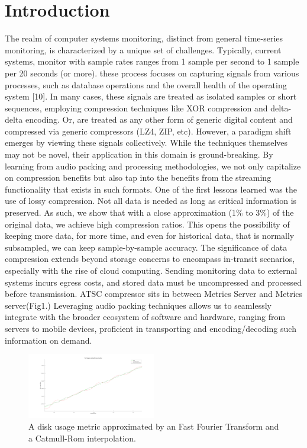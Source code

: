\documentclass[conference]{IEEEtran}
\begin{document}
\section{Introduction}
The realm of computer systems monitoring, distinct from general time-series monitoring, is characterized by a unique set of challenges. 
Typically, current systems, monitor with sample rates ranges from 1 sample per second to 1 sample per 20 seconds (or more). 
these process focuses on capturing signals from various processes, such as database operations and the overall health of the operating system [10]. 
In many cases, these signals are treated as isolated samples or short sequences, employing compression techniques like XOR compression and delta-delta encoding. 
Or, are treated as any other form of generic digital content and compressed via generic compressors (LZ4, ZIP, etc).
However, a paradigm shift emerges by viewing these signals collectively. 
While the techniques themselves may not be novel, their application in this domain is ground-breaking. 
By learning from audio packing and processing methodologies, we not only capitalize on compression benefits but also tap into the benefits from the streaming functionality that exists in such formats.
One of the first lessons learned was the use of lossy compression. 
Not all data is needed as long as critical information is preserved.
As such, we show that with a close approximation (1\% to 3\%) of the original data, we achieve high compression ratios. 
This opens the possibility of keeping more data, for more time, and even for historical data, that is normally subsampled, we can keep sample-by-sample accuracy.
The significance of data compression extends beyond storage concerns to encompass in-transit scenarios, especially with the rise of cloud computing.
Sending monitoring data to external systems incurs egress costs, and stored data must be uncompressed and processed before transmission.
ATSC compressor sits in  between Metrics Server and Metrics server(Fig1.) Leveraging audio packing techniques allows us to seamlessly integrate with the broader ecosystem of software and hardware, ranging from servers to mobile devices, proficient in transporting and encoding/decoding such information on demand. 

\begin{figure}[ht]
  \centering
  \includegraphics[width=0.5\textwidth]{math_approximation.png}
  \caption{A disk usage metric approximated by an Fast Fourier Transform and a Catmull-Rom interpolation.}
  \label{Fig.1}
\end{figure}
\end{document}
